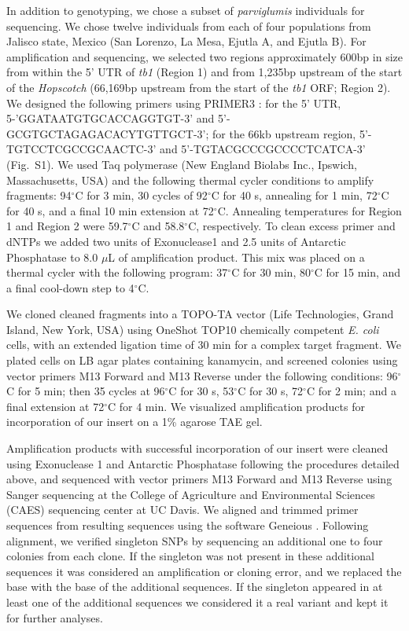 \documentclass[11pt]{article}
\begin{document}
\begin{linenumbers}
\begin{flushleft}
In addition to genotyping, we chose a subset of \emph{parviglumis} individuals for sequencing. We chose twelve individuals from each of four populations from Jalisco state, Mexico (San Lorenzo, La Mesa, Ejutla A, and Ejutla B). For amplification and sequencing, we selected two regions approximately 600bp in size from within the 5' UTR of \emph{tb1} (Region 1) and from 1,235bp upstream of the start of the \emph{Hopscotch} (66,169bp upstream from the start of the \emph{tb1} ORF; Region 2). We designed the following primers using PRIMER3 \citep{RozenSkaletsky2000}: for the 5' UTR, {\small 5-'GGATAATGTGCACCAGGTGT-3'} and {\small 5'-GCGTGCTAGAGACACYTGTTGCT-3'}; for the 66kb upstream region, {\small 5'-TGTCCTCGCCGCAACTC-3'} and {\small 5'-TGTACGCCCGCCCCTCATCA-3'} (Fig.~S1). We used Taq polymerase (New England Biolabs Inc., Ipswich, Massachusetts, USA) and the following thermal cycler conditions to amplify fragments: 94$^{\circ}$C for 3 min, 30 cycles of 92$^{\circ}$C for 40 s, annealing for 1 min, 72$^{\circ}$C for 40 s, and a final 10 min extension at 72$^{\circ}$C. Annealing temperatures for Region 1 and Region 2 were 59.7$^{\circ}$C and 58.8$^{\circ}$C, respectively. To clean excess primer and dNTPs we added two units of Exonuclease1 and 2.5 units of Antarctic Phosphatase to 8.0 $\mu$L of amplification product. This mix was placed on a thermal cycler with the following program: 37$^{\circ}$C for 30 min, 80$^{\circ}$C for 15 min, and a final cool-down step to 4$^{\circ}$C. 

We cloned cleaned fragments into a TOPO-TA vector (Life Technologies, Grand Island, New York, USA) using OneShot TOP10 chemically competent \emph{E. coli} cells, with an extended ligation time of 30 min for a complex target fragment. We plated cells on LB agar plates containing kanamycin, and screened colonies using vector primers M13 Forward and M13 Reverse under the following conditions: 96$^{\circ}$C for 5 min; then 35 cycles at 96$^{\circ}$C for 30 s, 53$^{\circ}$C for 30 s, 72$^{\circ}$C for 2 min; and a final extension at 72$^{\circ}$C for 4 min. We visualized amplification products for incorporation of our insert on a 1\% agarose TAE gel.

Amplification products with successful incorporation of our insert were cleaned using Exonuclease 1 and Antarctic Phosphatase following the procedures detailed above, and sequenced with vector primers M13 Forward and M13 Reverse using Sanger sequencing at the College of Agriculture and Environmental Sciences (CAES) sequencing center at UC Davis. We aligned and trimmed primer sequences from resulting sequences using the software Geneious \citep{Kearse2012}. Following alignment, we verified singleton SNPs by sequencing an additional one to four colonies from each clone. If the singleton was not present in these additional sequences it was considered an amplification or cloning error, and we replaced the base with the base of the additional sequences. If the singleton appeared in at least one of the additional sequences we considered it a real variant and kept it for further analyses. 


\end{flushleft}
\end{linenumbers}
\end{document}
